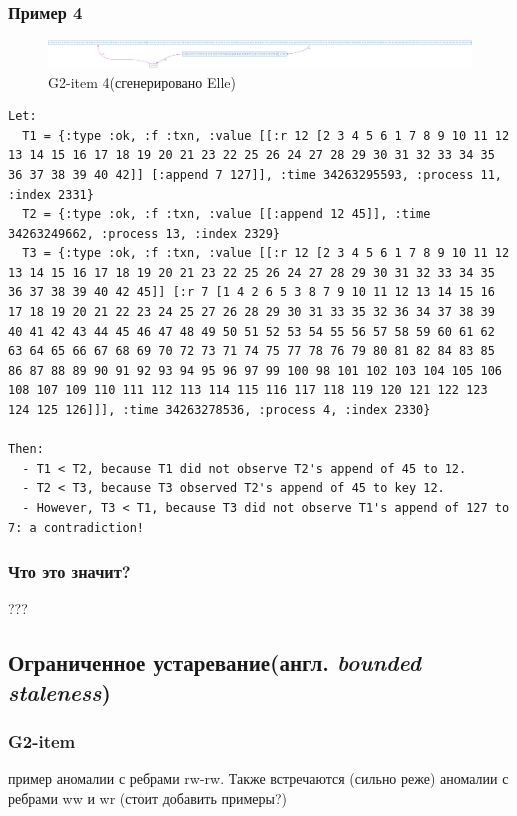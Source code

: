 \documentclass[12pt,  openany]{book}
\begin{document}
\subsubsection{Пример 4}

\begin{figure}[H]
  \includegraphics[width=\textwidth]{strong/6-2.png}
  \caption{G2-item 4(сгенерировано Elle)}
\end{figure}
\par

\begin{lstlisting}[caption={Пояснение к G2-item 4 аномалии (сгенерировано Elle)}]
Let:
  T1 = {:type :ok, :f :txn, :value [[:r 12 [2 3 4 5 6 1 7 8 9 10 11 12 13 14 15 16 17 18 19 20 21 23 22 25 26 24 27 28 29 30 31 32 33 34 35 36 37 38 39 40 42]] [:append 7 127]], :time 34263295593, :process 11, :index 2331}
  T2 = {:type :ok, :f :txn, :value [[:append 12 45]], :time 34263249662, :process 13, :index 2329}
  T3 = {:type :ok, :f :txn, :value [[:r 12 [2 3 4 5 6 1 7 8 9 10 11 12 13 14 15 16 17 18 19 20 21 23 22 25 26 24 27 28 29 30 31 32 33 34 35 36 37 38 39 40 42 45]] [:r 7 [1 4 2 6 5 3 8 7 9 10 11 12 13 14 15 16 17 18 19 20 21 22 23 24 25 27 26 28 29 30 31 33 35 32 36 34 37 38 39 40 41 42 43 44 45 46 47 48 49 50 51 52 53 54 55 56 57 58 59 60 61 62 63 64 65 66 67 68 69 70 72 73 71 74 75 77 78 76 79 80 81 82 84 83 85 86 87 88 89 90 91 92 93 94 95 96 97 99 100 98 101 102 103 104 105 106 108 107 109 110 111 112 113 114 115 116 117 118 119 120 121 122 123 124 125 126]]], :time 34263278536, :process 4, :index 2330}

Then:
  - T1 < T2, because T1 did not observe T2's append of 45 to 12.
  - T2 < T3, because T3 observed T2's append of 45 to key 12.
  - However, T3 < T1, because T3 did not observe T1's append of 127 to 7: a contradiction!
\end{lstlisting}

\subsubsection{Что это значит?}
???

\subsection{Ограниченное устаревание(англ.  \textit{bounded staleness})}
\subsubsection{G2-item}
пример аномалии с ребрами rw-rw. Также встречаются (сильно реже) аномалии с ребрами ww и wr (стоит добавить примеры?)
\end{document}

